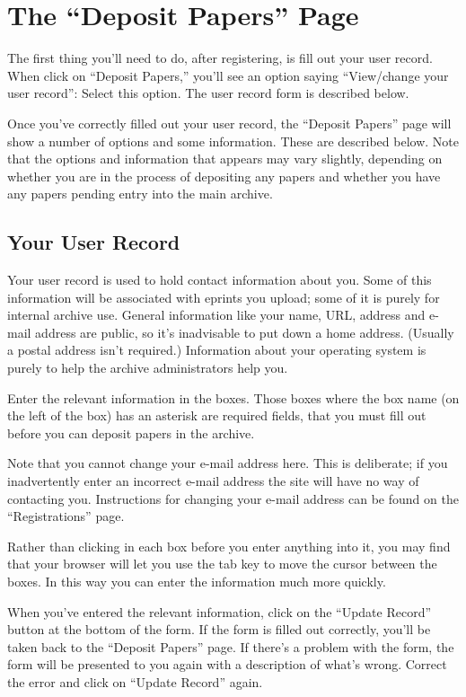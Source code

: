 \section{The ``Deposit Papers'' Page}


The first thing you'll need to do, after registering, is fill out your user record.  When click on ``Deposit Papers,'' you'll see an option saying ``View/change your user record'': Select this option. The user record form is described below.

Once you've correctly filled out your user record, the ``Deposit Papers'' page will show a number of options and some information. These are described below. Note that the options and information that appears may vary slightly, depending on whether you are in the process of depositing any papers and whether you have any papers pending entry into the main archive.


\subsection{Your User Record}

Your user record is used to hold contact information about you. Some of this information will be associated with eprints you upload; some of it is purely for internal archive use. General information like your name, URL, address and e-mail address are public, so it's inadvisable to put down a home address. (Usually a postal address isn't required.) Information about your operating system is purely to help the archive administrators help you.

Enter the relevant information in the boxes. Those boxes where the box name (on the left of the box) has an asterisk are required fields, that you must fill out before you can deposit papers in the archive.

Note that you cannot change your e-mail address here. This is deliberate; if you inadvertently enter an incorrect e-mail address the site will have no way of contacting you. Instructions for changing your e-mail address can be found on the ``Registrations'' page.

Rather than clicking in each box before you enter anything into it, you may find that your browser will let you use the tab key to move the cursor between the boxes. In this way you can enter the information much more quickly.

When you've entered the relevant information, click on the ``Update Record'' button at the bottom of the form. If the form is filled out correctly, you'll be taken back to the ``Deposit Papers'' page. If there's a problem with the form, the form will be presented to you again with a description of what's wrong. Correct the error and click on ``Update Record'' again.


